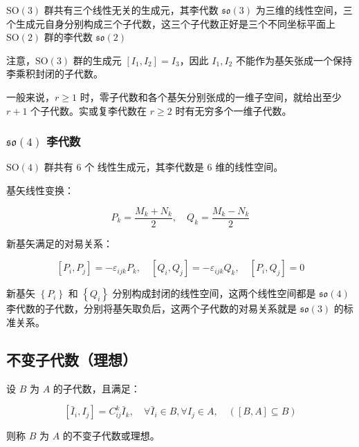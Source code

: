 $\mathrm{SO}\left(3\right)$ 群共有三个线性无关的生成元，其李代数 $\mathfrak{so}\left(3\right)$ 为三维的线性空间，三个生成元自身分别构成三个子代数，这三个子代数正好是三个不同坐标平面上 $\mathrm{SO}\left(2\right)$ 群的李代数 $\mathfrak{so}\left(2\right)$

注意，$\mathrm{SO}\left(3\right)$ 群的生成元 $\left[I_1,I_2 \right]=I_3$，因此 $I_1,I_2$ 不能作为基矢张成一个保持李乘积封闭的子代数。

一般来说，$r\geqslant1$ 时，零子代数和各个基矢分别张成的一维子空间，就给出至少 $r+1$ 个子代数。实或复李代数在 $r\geqslant2$ 时有无穷多个一维子代数。

\subsubsection*{\texorpdfstring{$\mathfrak{so}\left(4\right)$ 李代数}{so(4) 李代数}}

$\mathrm{SO}\left(4\right)$ 群共有 $6$ 个 线性生成元，其李代数是 $6$ 维的线性空间。

基矢线性变换：

\begin{equation}
P_k = \frac{M_k+N_k }{2 } ,\quad
Q_k = \frac{M_k-N_k }{2 }
\end{equation}

新基矢满足的对易关系：

\begin{equation}
\left[P_i,P_j \right]=-\varepsilon_{ijk} P_k,\quad
\left[Q_i,Q_j \right]=-\varepsilon_{ijk} Q_k,\quad
\left[P_i,Q_j \right]=0
\end{equation}

新基矢 $\left\{P_i \right\}$ 和 $\left\{Q_i \right\}$ 分别构成封闭的线性空间，这两个线性空间都是 $\mathfrak{so}\left(4\right)$李代数的子代数，分别将基矢取负后，这两个子代数的对易关系就是 $\mathfrak{so}\left(3\right)$ 的标准关系。

\subsection{不变子代数（理想）}

设 $B$ 为 $A$ 的子代数，且满足：

\begin{equation}
\left[\bar{I}_i,I_j \right] = C_{ij}^k \bar{I}_k,\quad \forall \bar{I}_i \in B,\forall I_j\in A,\quad\left(\left[B,A \right]\subseteq B \right)
\end{equation}

则称 $B$ 为 $A$ 的不变子代数或理想。

